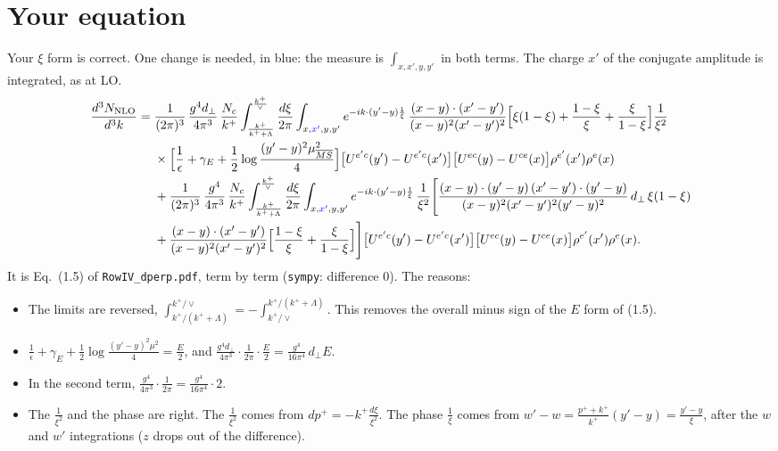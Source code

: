 \documentclass[10pt]{article}
\numberwithin{equation}{section}
\newcommand{\new}[1]{{\color{blue}#1}}
\begin{document}
\section{Your equation}\label{sec:check}
Your $\xi$ form is correct. One change is needed, in blue: the measure is $\int_{x,x',y,y'}$ in both terms. The charge $x'$ of the conjugate amplitude is integrated, as at LO.
\begin{align}
\frac{d^{3}N_{\rm NLO}}{d^{3}k}={}&\frac{1}{(2\pi)^{3}}\,\frac{g^{4}d_{\perp}}{4\pi^{3}}\,\frac{N_{c}}{k^{+}}\int_{\frac{k^{+}}{k^{+}+\Lambda}}^{\frac{k^{+}}{\vee}}\frac{d\xi}{2\pi}\int_{x,\new{x'},y,y'}e^{-ik\cdot(y'-y)\frac{1}{\xi}}\,\frac{(x-y)\cdot(x'-y')}{(x-y)^{2}(x'-y')^{2}}\Big[\xi(1-\xi)+\frac{1-\xi}{\xi}+\frac{\xi}{1-\xi}\Big]\frac{1}{\xi^{2}}\notag\\
&\times\Big[\frac{1}{\epsilon}+\gamma_{E}+\frac{1}{2}\log\frac{(y'-y)^{2}\mu^{2}_{\overline{MS}}}{4}\Big]\big[U^{e'c}(y')-U^{e'c}(x')\big]\big[U^{ec}(y)-U^{ce}(x)\big]\rho^{e'}(x')\rho^{e}(x)\notag\\
&+\frac{1}{(2\pi)^{3}}\,\frac{g^{4}}{4\pi^{3}}\,\frac{N_{c}}{k^{+}}\int_{\frac{k^{+}}{k^{+}+\Lambda}}^{\frac{k^{+}}{\vee}}\frac{d\xi}{2\pi}\int_{x,\new{x'},y,y'}e^{-ik\cdot(y'-y)\frac{1}{\xi}}\,\frac{1}{\xi^{2}}\Bigg[\frac{(x-y)\cdot(y'-y)\,(x'-y')\cdot(y'-y)}{(x-y)^{2}(x'-y')^{2}(y'-y)^{2}}\,d_{\perp}\,\xi(1-\xi)\notag\\
&+\frac{(x-y)\cdot(x'-y')}{(x-y)^{2}(x'-y')^{2}}\Big[\frac{1-\xi}{\xi}+\frac{\xi}{1-\xi}\Big]\Bigg]\big[U^{e'c}(y')-U^{e'c}(x')\big]\big[U^{ec}(y)-U^{ce}(x)\big]\rho^{e'}(x')\rho^{e}(x).
\label{eq:user}
\end{align}
It is Eq.~(1.5) of \texttt{RowIV\_dperp.pdf}, term by term (\texttt{sympy}: difference $0$). The reasons:
\begin{itemize}
\item The limits are reversed, $\int_{k^+/(k^++\Lambda)}^{k^+/\vee}=-\int_{k^+/\vee}^{k^+/(k^++\Lambda)}$. This removes the overall minus sign of the $E$ form of (1.5).
\item $\frac{1}{\epsilon}+\gamma_E+\frac12\log\frac{(y'-y)^2\mu^2}{4}=\frac{E}{2}$, and $\frac{g^4d_\perp}{4\pi^3}\cdot\frac{1}{2\pi}\cdot\frac{E}{2}=\frac{g^4}{16\pi^4}\,d_\perp E$.
\item In the second term, $\frac{g^4}{4\pi^3}\cdot\frac{1}{2\pi}=\frac{g^4}{16\pi^4}\cdot2$.
\item The $\frac{1}{\xi^2}$ and the phase are right. The $\frac{1}{\xi^2}$ comes from $dp^+=-k^+\frac{d\xi}{\xi^2}$. The phase $\frac1\xi$ comes from $w'-w=\frac{p^++k^+}{k^+}(y'-y)=\frac{y'-y}{\xi}$, after the $w$ and $w'$ integrations ($z$ drops out of the difference).
\end{itemize}
\end{document}
